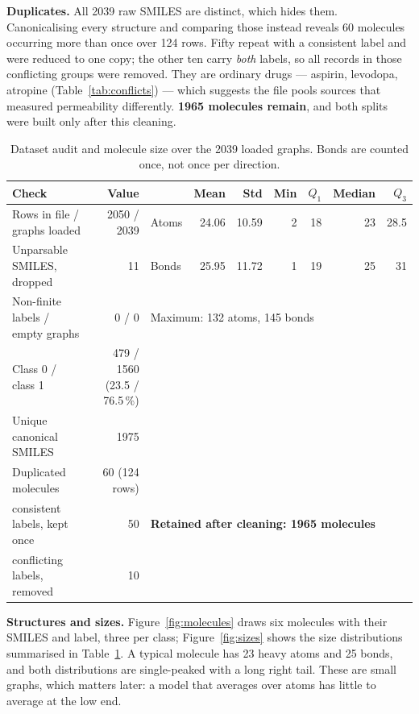 \documentclass[10pt]{article}
\begin{document}
\textbf{Duplicates.} All 2039 raw SMILES are distinct, which hides them. Canonicalising every structure and comparing
those instead reveals 60 molecules occurring more than once over 124 rows. Fifty repeat with a consistent label and
were reduced to one copy; the other ten carry \emph{both} labels, so all records in those conflicting groups were
removed. They are ordinary drugs --- aspirin, levodopa, atropine (Table~\ref{tab:conflicts}) --- which suggests the
file pools sources that measured permeability differently. \textbf{1965 molecules remain}, and both splits were built
only after this cleaning.

\begin{table}[H]
    \centering
    \caption{Dataset audit and molecule size over the 2039 loaded graphs. Bonds are counted once, not once per direction.}
    \label{tab:audit}
    \footnotesize
    \setlength{\tabcolsep}{5pt}
    \begin{tabular}{lr@{\hspace{2.2em}}lrrrrrr}
        \toprule
        Check & Value & & Mean & Std & Min & $Q_1$ & Median & $Q_3$ \\
        \midrule
        Rows in file / graphs loaded     & 2050 / 2039 & Atoms & 24.06 & 10.59 & 2 & 18 & 23 & 28.5 \\
        Unparsable SMILES, dropped       & 11          & Bonds & 25.95 & 11.72 & 1 & 19 & 25 & 31 \\
        Non-finite labels / empty graphs & 0 / 0       & \multicolumn{7}{l}{Maximum: 132 atoms, 145 bonds} \\
        Class 0 / class 1 & 479 / 1560 (23.5 / 76.5\,\%) & \multicolumn{7}{l}{} \\
        Unique canonical SMILES & 1975 & \multicolumn{7}{l}{} \\
        Duplicated molecules & 60 (124 rows) & \multicolumn{7}{l}{} \\
        \quad consistent labels, kept once & 50 & \multicolumn{7}{l}{\textbf{Retained after cleaning: 1965 molecules}} \\
        \quad conflicting labels, removed & 10 & \multicolumn{7}{l}{} \\
        \bottomrule
    \end{tabular}
\end{table}

\textbf{Structures and sizes.} Figure~\ref{fig:molecules} draws six molecules with their SMILES and label, three per
class; Figure~\ref{fig:sizes} shows the size distributions summarised in Table~\ref{tab:audit}. A typical molecule
has 23 heavy atoms and 25 bonds, and both distributions are single-peaked with a long right tail. These are small
graphs, which matters later: a model that averages over atoms has little to average at the low end.
\end{document}
